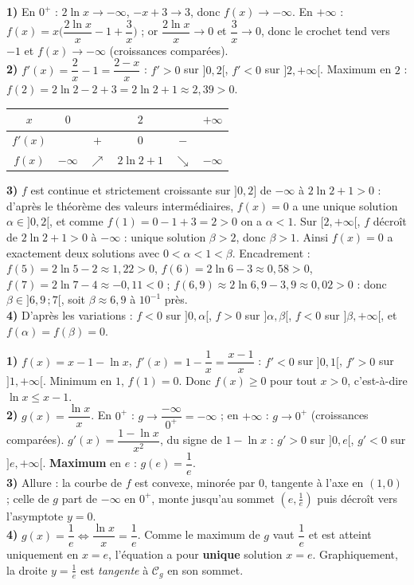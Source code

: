 \textbf{1)} En $0^{+}$ : $2\ln x\to-\infty$, $-x+3\to3$, donc $f(x)\to-\infty$. En $+\infty$ :
$f(x)=x\Big(\dfrac{2\ln x}{x}-1+\dfrac3x\Big)$ ; or $\dfrac{2\ln x}{x}\to0$ et $\dfrac3x\to0$,
donc le crochet tend vers $-1$ et $f(x)\to-\infty$ (croissances comparées).\\
\textbf{2)} $f'(x)=\dfrac2x-1=\dfrac{2-x}{x}$ : $f'>0$ sur $]0,2[$, $f'<0$ sur $]2,+\infty[$.
Maximum en $2$ : $f(2)=2\ln 2-2+3=2\ln 2+1\approx2{,}39>0$.
\begin{center}\small
\begin{tabular}{c|ccccc}
$x$ & $0$ & & $2$ & & $+\infty$\\
\hline
$f'(x)$ & & $+$ & $0$ & $-$ & \\
\hline
$f(x)$ & $-\infty$ & $\nearrow$ & $2\ln2+1$ & $\searrow$ & $-\infty$\\
\end{tabular}
\end{center}
\textbf{3)} $f$ est continue et strictement croissante sur $]0,2]$ de $-\infty$ à
$2\ln2+1>0$ : d'après le théorème des valeurs intermédiaires, $f(x)=0$ a une unique
solution $\alpha\in]0,2[$, et comme $f(1)=0-1+3=2>0$ on a $\alpha<1$. Sur $[2,+\infty[$, $f$
décroît de $2\ln2+1>0$ à $-\infty$ : unique solution $\beta>2$, donc $\beta>1$. Ainsi
$f(x)=0$ a exactement deux solutions avec $0<\alpha<1<\beta$. Encadrement : $f(5)=2\ln5-2
\approx1{,}22>0$, $f(6)=2\ln6-3\approx0{,}58>0$, $f(7)=2\ln7-4\approx-0{,}11<0$ ;
$f(6{,}9)\approx2\ln6{,}9-3{,}9\approx0{,}02>0$ : donc $\beta\in]6{,}9\,;7[$, soit
$\beta\approx6{,}9$ à $10^{-1}$ près.\\
\textbf{4)} D'après les variations : $f<0$ sur $]0,\alpha[$, $f>0$ sur $]\alpha,\beta[$,
$f<0$ sur $]\beta,+\infty[$, et $f(\alpha)=f(\beta)=0$.

\textbf{1)} $f(x)=x-1-\ln x$, $f'(x)=1-\dfrac1x=\dfrac{x-1}{x}$ : $f'<0$ sur $]0,1[$, $f'>0$
sur $]1,+\infty[$. Minimum en $1$, $f(1)=0$. Donc $f(x)\ge0$ pour tout $x>0$, c'est-à-dire
$\ln x\le x-1$.\\
\textbf{2)} $g(x)=\dfrac{\ln x}{x}$. En $0^{+}$ : $g\to\dfrac{-\infty}{0^{+}}=-\infty$ ; en
$+\infty$ : $g\to0^{+}$ (croissances comparées). $g'(x)=\dfrac{1-\ln x}{x^{2}}$, du signe de
$1-\ln x$ : $g'>0$ sur $]0,e[$, $g'<0$ sur $]e,+\infty[$. \textbf{Maximum} en $e$ :
$g(e)=\dfrac1e$.\\
\textbf{3)} Allure : la courbe de $f$ est convexe, minorée par $0$, tangente à l'axe en
$(1,0)$ ; celle de $g$ part de $-\infty$ en $0^{+}$, monte jusqu'au sommet $(e,\frac1e)$ puis
décroît vers l'asymptote $y=0$.\\
\textbf{4)} $g(x)=\dfrac1e\iff\dfrac{\ln x}{x}=\dfrac1e$. Comme le maximum de $g$ vaut
$\dfrac1e$ et est atteint uniquement en $x=e$, l'équation a pour \textbf{unique} solution
$x=e$. Graphiquement, la droite $y=\frac1e$ est \emph{tangente} à $\mathcal C_g$ en son
sommet.
